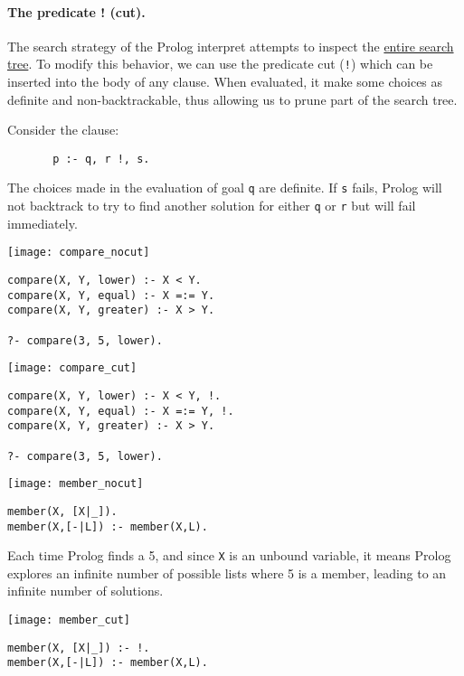 \documentclass{article}
\begin{document}
\paragraph{The predicate ! (cut).} The search strategy of the Prolog interpret
attempts to inspect the \underline{entire search tree}. To modify this
behavior, we can use the predicate cut (\texttt{!}) which can be inserted into
the body of any clause. When evaluated, it make some choices as definite and
non-backtrackable, thus allowing us to prune part of the search tree.
\begin{example}
    Consider the clause:
    \begin{verbatim}
       p :- q, r !, s.
    \end{verbatim}
    The choices made in the evaluation of goal \texttt{q} are definite. If
    \texttt{s} fails, Prolog will not backtrack to try to find another
    solution for either \texttt{q} or \texttt{r} but will fail immediately.
\end{example}
\begin{example}
    \begin{center}
        \texttt{[image: compare\_nocut]}
    \end{center}
   \begin{verbatim}
compare(X, Y, lower) :- X < Y.
compare(X, Y, equal) :- X =:= Y.
compare(X, Y, greater) :- X > Y.

?- compare(3, 5, lower).
   \end{verbatim} 
    \begin{center}
        \texttt{[image: compare\_cut]}
    \end{center}
   \begin{verbatim}
compare(X, Y, lower) :- X < Y, !.
compare(X, Y, equal) :- X =:= Y, !.
compare(X, Y, greater) :- X > Y.

?- compare(3, 5, lower).
   \end{verbatim} 
\end{example}
\begin{example}
    \begin{center}
        \texttt{[image: member\_nocut]}
    \end{center}
   \begin{verbatim}
member(X, [X|_]). 
member(X,[-|L]) :- member(X,L).
   \end{verbatim}
   Each time Prolog finds a 5, and since \texttt{X} is an unbound variable, it
   means Prolog explores an infinite number of possible lists where 5 is a
   member, leading to an infinite number of solutions.
    \begin{center}
        \texttt{[image: member\_cut]}
    \end{center}
   \begin{verbatim}
member(X, [X|_]) :- !. 
member(X,[-|L]) :- member(X,L).
   \end{verbatim} 
\end{example}
\end{document}
